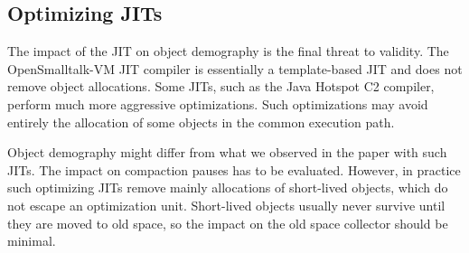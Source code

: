 \documentclass[sigplan,10pt,screen]{acmart}\settopmatter{printfolios=true,printccs=true,printacmref=true}
\newcommand{\eem}[1]{\color{olive}\fbox{\bfseries\sffamily\scriptsize Eliot:}{\sf\small$\blacktriangleright$\textit{#1}$\blacktriangleleft$}\color{black}}
\def\OpenSmalltalkVM{OpenSmalltalk-VM\xspace}
\begin{document}
\subsection{Optimizing JITs} 
\label{sec:optJITDisc}
The impact of the JIT on object demography is the final threat to validity. The \OpenSmalltalkVM JIT compiler is essentially a template-based JIT and does not remove object allocations. 
Some JITs, such as the Java Hotspot C2 compiler, perform much more aggressive optimizations. Such optimizations may avoid entirely the allocation of some objects in the common execution path. %

Object demography might differ from what we observed in the paper with such JITs. The impact on compaction pauses has to be evaluated. However, in practice such optimizing JITs remove mainly allocations of short-lived objects, which do not escape an optimization unit. Short-lived objects usually never survive until they are moved to old space, so the impact on the old space collector should be minimal. 


%
\end{document}
